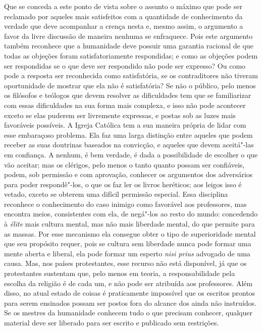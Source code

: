 Que se conceda a este ponto de vista sobre o assunto o máximo que pode
ser reclamado por aqueles mais satisfeitos com a quantidade de
conhecimento da verdade que deve acompanhar a crença nesta e, mesmo
assim, o argumento a favor da livre discussão de maneira nenhuma se
enfraquece. Pois este argumento também reconhece que a humanidade deve
possuir uma garantia racional de que todas as objeções foram
satisfatoriamente respondidas; e como as objeções podem ser respondidas
se o que deve ser respondido não pode ser expresso? Ou como pode a
resposta ser reconhecida como satisfatória, se os contraditores não
tiveram oportunidade de mostrar que ela não é satisfatória? Se não o
público, pelo menos os filósofos e teólogos que devem resolver as
dificuldades tem que se familiarizar com essas dificuldades na sua
forma mais complexa, e isso não pode acontecer exceto se elas puderem
ser livremente expressas, e postas sob as luzes mais favoráveis
possíveis. A Igreja Católica tem a sua maneira própria de lidar com esse
embaraçoso problema. Ela faz uma larga distinção entre aqueles que
podem receber as suas doutrinas baseados na convicção, e aqueles que
devem aceitá"-las em confiança. A nenhum, é bem verdade, é dada a
possibilidade de escolher o que vão aceitar; mas os clérigos, pelo
menos o tanto quanto possam ser confiáveis, podem, sob permissão e com
aprovação, conhecer os argumentos dos adversários para poder
respondê"-los, o que os faz ler os livros heréticos; aos leigos isso
é vetado, exceto se obterem uma difícil permissão especial. Essa
disciplina reconhece o conhecimento do caso inimigo como favorável aos
professores, mas encontra meios, consistentes com ela, de negá"-los ao
resto do mundo: concedendo à \textit{élite} mais cultura mental, mas
não mais liberdade mental, do que permite para as massas. Por esse
mecanismo ela consegue obter o tipo de superioridade mental que seu
propósito requer, pois se cultura sem liberdade nunca pode formar uma
mente aberta e liberal, ela pode formar um esperto \textit{nisi prius}
advogado de uma causa. Mas, nos países protestantes, esse recurso não
está disponível, já que os protestantes sustentam que, pelo menos em
teoria, a responsabilidade pela escolha da religião é de cada um, e não
pode ser atribuída aos professores. Além disso, no atual estado de
coisas é praticamente impossível que os escritos prontos para serem
ensinados possam ser postos fora do alcance dos ainda não instruídos.
Se os mestres da humanidade conhecem tudo o que
precisam conhecer, qualquer material deve ser liberado para ser
escrito e publicado sem restrições. 

